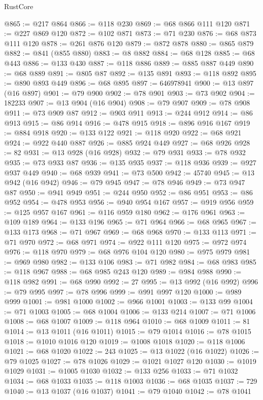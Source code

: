 \begin{lexlean}{RustCore}
\begin{coremodule}
@865 := @217 @864
@866 := @118 @230
@869 := @68 @866 @111 @120
@871 := @227 @869 @120
@872 := @102 @871
@873 := @71 @230
@876 := @68 @873 @111 @120
@878 := @261 @876 @120
@879 := @872 @878
@880 := @865 @879
@882 := @841 (@855 @880)
@883 := @8 @882
@884 := @68 @128
@885 := @68 @443
@886 := @133 @430
@887 := @118 @886
@889 := @885 @887 @449
@890 := @68 @889
@891 := @805 @87
@892 := @135 @891
@893 := @118 @892
@895 := @890 @893 @449
@896 := @68 @895
@897 := 646978941
@900 := @13 @897 (@16 @897)
@901 := @79 @900
@902 := @78 @901
@903 := @73 @902
@904 := 182233
@907 := @13 @904 (@16 @904)
@908 := @79 @907
@909 := @78 @908
@911 := @73 @909 @87
@912 := @903 @911
@913 := @244 @912
@914 := @86 @913
@915 := @86 @914
@916 := @478 @915
@918 := @896 @916 @167
@919 := @884 @918
@920 := @133 @122
@921 := @118 @920
@922 := @68 @921
@924 := @922 @440 @887
@926 := @885 @924 @449
@927 := @68 @926
@928 := 82
@931 := @13 @928 (@16 @928)
@932 := @79 @931
@933 := @78 @932
@935 := @73 @933 @87
@936 := @135 @935
@937 := @118 @936
@939 := @927 @937 @449
@940 := @68 @939
@941 := @73 @500
@942 := 45740
@945 := @13 @942 (@16 @942)
@946 := @79 @945
@947 := @78 @946
@949 := @73 @947 @87
@950 := @941 @949
@951 := @244 @950
@952 := @86 @951
@953 := @86 @952
@954 := @478 @953
@956 := @940 @954 @167
@957 := @919 @956
@959 := @125 @957 @167
@961 := @116 @959 @180
@962 := @176 @961
@963 := @109 @189
@964 := @133 @196
@965 := @71 @964
@966 := @68 @965
@967 := @133 @173
@968 := @71 @967
@969 := @68 @968
@970 := @133 @113
@971 := @71 @970
@972 := @68 @971
@974 := @922 @111 @120
@975 := @972 @974
@976 := @118 @970
@979 := @68 @976 @104 @120
@980 := @975 @979
@981 := @969 @980
@982 := @133 @106
@983 := @71 @982
@984 := @68 @983
@985 := @118 @967
@988 := @68 @985 @243 @120
@989 := @984 @988
@990 := @118 @982
@991 := @68 @990
@992 := 27
@995 := @13 @992 (@16 @992)
@996 := @79 @995
@997 := @78 @996
@999 := @991 @997 @120
@1000 := @989 @999
@1001 := @981 @1000
@1002 := @966 @1001
@1003 := @133 @99
@1004 := @71 @1003
@1005 := @68 @1004
@1006 := @133 @214
@1007 := @71 @1006
@1008 := @68 @1007
@1009 := @118 @964
@1010 := @68 @1009
@1011 := 81
@1014 := @13 @1011 (@16 @1011)
@1015 := @79 @1014
@1016 := @78 @1015
@1018 := @1010 @1016 @120
@1019 := @1008 @1018
@1020 := @118 @1006
@1021 := @68 @1020
@1022 := 243
@1025 := @13 @1022 (@16 @1022)
@1026 := @79 @1025
@1027 := @78 @1026
@1029 := @1021 @1027 @120
@1030 := @1019 @1029
@1031 := @1005 @1030
@1032 := @133 @256
@1033 := @71 @1032
@1034 := @68 @1033
@1035 := @118 @1003
@1036 := @68 @1035
@1037 := 729
@1040 := @13 @1037 (@16 @1037)
@1041 := @79 @1040
@1042 := @78 @1041

\end{coremodule}
\end{lexlean}
